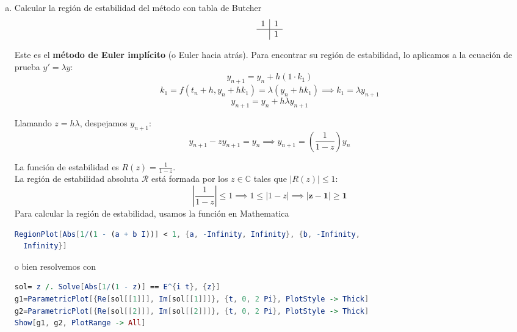 \begin{enumerate}[a)]
\begin{sol}
Sustituyendo en el ETL:
\[
\text{ETL} = \frac{h^3}{6} \left[ -\frac{1}{2} \begin{pmatrix} 0 \\ -2v^2 \end{pmatrix} + \begin{pmatrix} -2uv \\ 2u^3 \end{pmatrix} \right] = \mathbf{\frac{h^3}{6} \begin{pmatrix} -2y'y \\ (y')^2 + 2y^3 \end{pmatrix}}
\]
\textit{(expresado deshaciendo el cambio de variable $u=y, v=y'$).}
\end{sol}   
\vspace{0.8cm}
\item Calcular la región de estabilidad del método con tabla de Butcher
\[
\begin{array}{c|c}
1 & 1 \\
\hline
  & 1
\end{array}
\]
\begin{sol}
Este es el \textbf{método de Euler implícito} (o Euler hacia atrás). 
Para encontrar su región de estabilidad, lo aplicamos a la ecuación de prueba $y' = \lambda y$:
\[
y_{n+1} = y_n + h (1 \cdot k_1)
\]
\[
k_1 = f(t_n + h, y_n + h k_1) = \lambda (y_n + h k_1) \implies k_1 = \lambda y_{n+1}
\]
\[
y_{n+1} = y_n + h \lambda y_{n+1}
\]

Llamando $z = h\lambda$, despejamos $y_{n+1}$:
\[
y_{n+1} - z y_{n+1} = y_n \implies y_{n+1} = \left(\frac{1}{1-z}\right) y_n
\]

La función de estabilidad es $R(z) = \frac{1}{1-z}$. \\
La región de estabilidad absoluta $\mathcal{R}$ está formada por los $z \in \mathbb{C}$ tales que $|R(z)| \le 1$:
\[
\left| \frac{1}{1-z} \right| \le 1 \implies 1 \le |1 - z| \implies \mathbf{|z - 1| \ge 1}
\]
Para calcular la región de estabilidad, usamos la función en Mathematica
\begin{lstlisting}[language=Mathematica]
RegionPlot[Abs[1/(1 - (a + b I))] < 1, {a, -Infinity, Infinity}, {b, -Infinity, 
  Infinity}]
\end{lstlisting}
o bien resolvemos con \begin{lstlisting}[language=Mathematica]
sol= z /. Solve[Abs[1/(1 - z)] == E^{i t}, {z}]
g1=ParametricPlot[{Re[sol[[1]]], Im[sol[[1]]]}, {t, 0, 2 Pi}, PlotStyle -> Thick]
g2=ParametricPlot[{Re[sol[[2]]], Im[sol[[2]]]}, {t, 0, 2 Pi}, PlotStyle -> Thick]
Show[g1, g2, PlotRange -> All]
\end{lstlisting}


\end{sol}
\end{enumerate}
